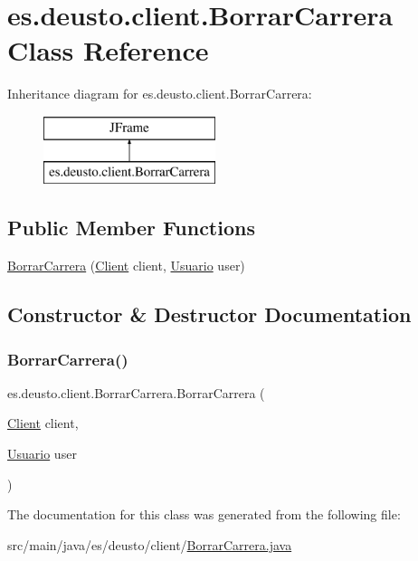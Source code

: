 \hypertarget{classes_1_1deusto_1_1client_1_1_borrar_carrera}{}\section{es.\+deusto.\+client.\+Borrar\+Carrera Class Reference}
\label{classes_1_1deusto_1_1client_1_1_borrar_carrera}
Inheritance diagram for es.\+deusto.\+client.\+Borrar\+Carrera\+:\begin{figure}[H]
\begin{center}
\leavevmode
\includegraphics[height=2.000000cm]{classes_1_1deusto_1_1client_1_1_borrar_carrera}
\end{center}
\end{figure}
\subsection*{Public Member Functions}
\begin{DoxyCompactItemize}
\item 
\mbox{\hyperlink{classes_1_1deusto_1_1client_1_1_borrar_carrera_a9fecff6662045446f0475bc998ba19b5}{Borrar\+Carrera}} (\mbox{\hyperlink{classes_1_1deusto_1_1client_1_1_client}{Client}} client, \mbox{\hyperlink{classes_1_1deusto_1_1server_1_1jdo_1_1_usuario}{Usuario}} user)
\end{DoxyCompactItemize}


\subsection{Constructor \& Destructor Documentation}
\mbox{\label{classes_1_1deusto_1_1client_1_1_borrar_carrera_a9fecff6662045446f0475bc998ba19b5}} 
\subsubsection{\texorpdfstring{BorrarCarrera()}{BorrarCarrera()}}
{\footnotesize\ttfamily es.\+deusto.\+client.\+Borrar\+Carrera.\+Borrar\+Carrera (\begin{DoxyParamCaption}\item[{\mbox{\hyperlink{classes_1_1deusto_1_1client_1_1_client}{Client}}}]{client,  }\item[{\mbox{\hyperlink{classes_1_1deusto_1_1server_1_1jdo_1_1_usuario}{Usuario}}}]{user }\end{DoxyParamCaption})}



The documentation for this class was generated from the following file\+:\begin{DoxyCompactItemize}
\item 
src/main/java/es/deusto/client/\mbox{\hyperlink{_borrar_carrera_8java}{Borrar\+Carrera.\+java}}\end{DoxyCompactItemize}

